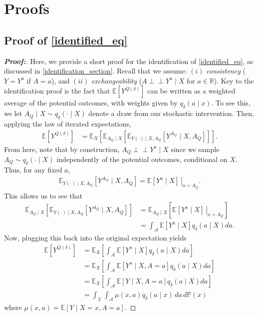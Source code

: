 \documentclass[11pt,twoside]{article}
\newcommand{\ind}{\perp\!\!\!\!\perp}
\def\ind{\perp\!\!\!\perp}
\theoremstyle{definition}
\theoremstyle{remark}
\begin{document}
\newpage 

\section{Proofs}
\label{sec:proofs}
\subsection{Proof of \texorpdfstring{\cref{identified_eq}}{Equation 2}} \label{identified_eq_proof}

\begin{proof}[\textbf{Proof:}] Here, we provide a short proof for the identification of \cref{identified_eq}, as discussed in \cref{identification_section}. Recall that we assume: $(i)$ \textit{consistency} ($Y = Y^a$ if $A = a$), and $(ii)$ \textit{exchangeability} ($A \ind Y^a \mid X$ for $a \in \mathbb{R}$). Key to the identification proof is the fact that $\mathbb{E}[Y^{Q(\delta)}]$ can be written as a weighted average of the potential outcomes, with weights given by $q_\delta(a \mid x)$. To see this, we let $A_Q \mid X \sim q_\delta( \cdot \mid X)$ denote a draw from our stochastic intervention. Then, applying the law of iterated expectations,
\begin{align*}
    \mathbb{E}[Y^{Q(\delta)}] &= \mathbb{E}_X\left[ \mathbb{E}_{A_Q \mid X}\left[ \mathbb{E}_{Y(\cdot) \mid X, A_Q}\left[Y^{A_Q} \mid X, A_Q \right] \right] \right].
\end{align*}
From here, note that by construction, $A_Q \ind Y^a \mid X$ since  we sample $A_Q \sim q_\delta(\cdot \mid X)$ independently of the potential outcomes, conditional on $X$. Thus, for any fixed $a$, 
\begin{align*}
    \mathbb{E}_{Y(\cdot) \mid X, A_Q}\left[Y^{A_Q} \mid X, A_Q \right] =  \left. \mathbb{E}\left[Y^{a} \mid X\right] \, \right|_{a=A_Q}.
\end{align*}
This allows us to see that
\begin{align*}
    \mathbb{E}_{A_Q \mid X}\left[ \mathbb{E}_{Y(\cdot) \mid X, A_Q}\left[Y^{A_Q} \mid X, A_Q \right] \right] &= \mathbb{E}_{A_Q \mid X}\left[\left. \mathbb{E}\left[Y^{a} \mid X\right] \, \right|_{a=A_Q} \right] \\
    &= \int_\mathcal{A} \mathbb{E}[Y^a \mid X] q_\delta(a \mid X) da.
\end{align*}
Now, plugging this back into the original expectation yields
\begin{align*}
    \mathbb{E}[Y^{Q(\delta)}] &= \mathbb{E}_X\left[\int_\mathcal{A} \mathbb{E}[Y^a \mid X] q_\delta(a \mid X) da \right] \\
    &= \mathbb{E}_X\left[\int_\mathcal{A} \mathbb{E}[Y^a \mid X, A = a] q_\delta(a \mid X) da \right] \tag{By $(ii)$} \\
    &=  \mathbb{E}_X\left[\int_\mathcal{A} \mathbb{E}[Y \mid X, A = a] q_\delta(a \mid X) da \right] \tag{By $(i)$} \\ 
    &= \int_\mathcal{X} \int_\mathcal{A} \mu(x, a) q_\delta(a \mid x) \, da \, d\mathbb{P}(x)
\end{align*}
where $\mu(x, a) = \mathbb{E}[Y \mid X = x, A = a]$.

    
\end{proof}
\end{document}
